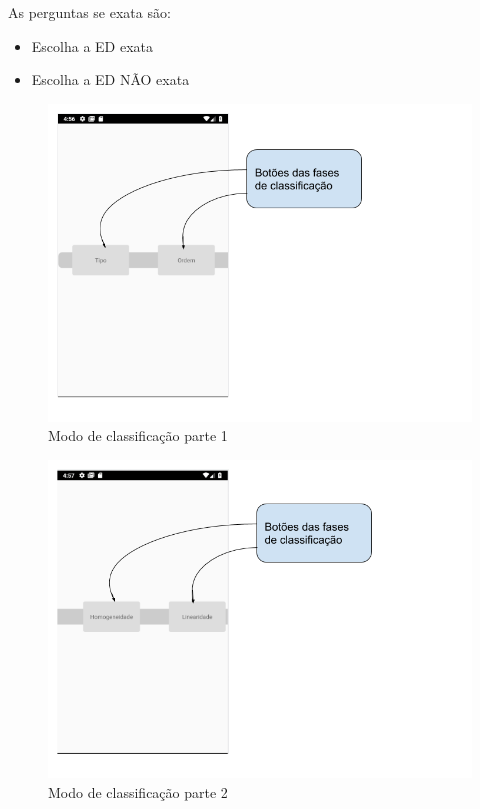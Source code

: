As perguntas se exata são:
\begin{itemize}
	\item{}Escolha a ED exata
	\item{}Escolha a ED NÃO exata
\end{itemize} 

\begin{figure}[H]
\centering
\caption{Modo de classificação parte 1}
\includegraphics[scale=0.72]{figuras/modo_classificacao_1.png}
\end{figure}

\begin{figure}[H]
\centering
\caption{Modo de classificação parte 2}
\includegraphics[scale=0.72]{figuras/modo_classificacao_2.png}
\end{figure}

